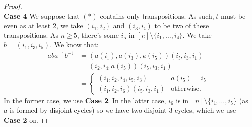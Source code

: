 \begin{proof}
    \\[\baselineskip]
    \textbf{Case 4}
    We suppose that $(\ast)$ contains only transpositions.
    As such, $t$ must be even as at least 2, we take $(i_1, i_2)$
    and $(i_3, i_4)$ to be two of these transpositions. As $n \geq 5$,
    there's some $i_5$ in $[n] \setminus \{i_1, \ldots, i_4\}$. We
    take $b = (i_1, i_3, i_5)$. We know that: \begin{align*}
        aba^{-1}b^{-1}
        &= (a(i_1), a(i_3), a(i_5))(i_5, i_3, i_1) \\
        &= (i_2, i_4, a(i_5))(i_5, i_3, i_1) \\
        &= \begin{cases}
            (i_1, i_2, i_4, i_5, i_3) & a(i_5) = i_5 \\
            (i_1, i_2, i_6)(i_5, i_3, i_1) & \text{otherwise}.
        \end{cases}
    \end{align*} In the former case, we use \textbf{Case 2}.
    In the latter case, $i_6$ is in $[n] \setminus 
    \{i_1, \ldots, i_5\}$ (as $a$ is formed by disjoint cycles)
    so we have two disjoint 3-cycles, which we use \textbf{Case 2}
    on.
\end{proof}
